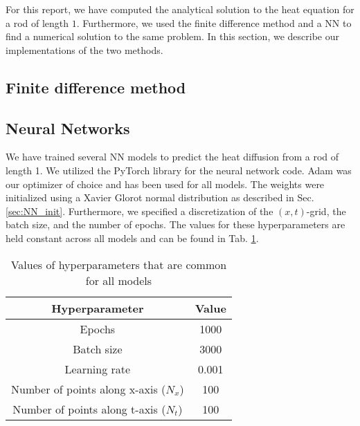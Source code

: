 For this report, we have computed the analytical solution to the heat equation for a rod of length $1$. 
Furthermore, we used the finite difference method and a NN to find a numerical solution to the same problem. 
In this section, we describe our implementations of the two methods. 

\subsection{Finite difference method}


\subsection{Neural Networks}

We have trained several NN models to predict the heat diffusion from a rod of length 1.
We utilized the PyTorch library \cite{Ansel_PyTorch_2_Faster_2024} for the neural network code. 
Adam was our optimizer of choice and has been used for all models. 
The weights were initialized using a Xavier Glorot normal distribution as described in Sec. \ref{sec:NN_init}. 
Furthermore, we specified a discretization of the $(x,t)$-grid, the batch size, and the number of epochs. 
The values for these hyperparameters are held constant across all models and can be found in Tab. \ref{tab:valuesfornn}. 

\begin{table}[h!]
    \centering
    \begin{tabular}{|c|c|}
    \hline
        \textbf{Hyperparameter} & \textbf{Value}  \\ \hline
        Epochs & 1000  \\ \hline
        Batch size & 3000 \\\hline
        Learning rate & 0.001 \\ \hline
        Number of points along x-axis ($N_x$) & 100 \\ \hline
        Number of points along t-axis ($N_t$) & 100 \\ \hline
    \end{tabular}
    \caption{Values of hyperparameters that are common for all models}
    \label{tab:valuesfornn}
\end{table}


